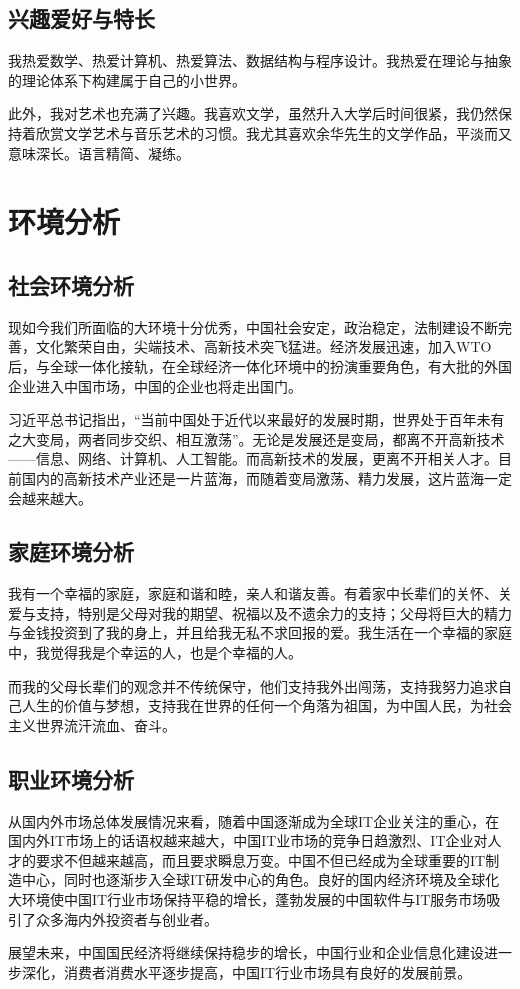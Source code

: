 \documentclass{article}
\begin{document}
\subsection{兴趣爱好与特长}
我热爱数学、热爱计算机、热爱算法、数据结构与程序设计。我热爱在理论与抽象的理论体系下构建属于自己的小世界。\par
此外，我对艺术也充满了兴趣。我喜欢文学，虽然升入大学后时间很紧，我仍然保持着欣赏文学艺术与音乐艺术的习惯。我尤其喜欢余华先生的文学作品，平淡而又意味深长。语言精简、凝练。

\section{环境分析}

\subsection{社会环境分析}
现如今我们所面临的大环境十分优秀，中国社会安定，政治稳定，法制建设不断完善，文化繁荣自由，尖端技术、高新技术突飞猛进。经济发展迅速，加入WTO后，与全球一体化接轨，在全球经济一体化环境中的扮演重要角色，有大批的外国企业进入中国市场，中国的企业也将走出国门。\par
习近平总书记指出，“当前中国处于近代以来最好的发展时期，世界处于百年未有之大变局，两者同步交织、相互激荡”。无论是发展还是变局，都离不开高新技术——信息、网络、计算机、人工智能。而高新技术的发展，更离不开相关人才。目前国内的高新技术产业还是一片蓝海，而随着变局激荡、精力发展，这片蓝海一定会越来越大。

\subsection{家庭环境分析}
我有一个幸福的家庭，家庭和谐和睦，亲人和谐友善。有着家中长辈们的关怀、关爱与支持，特别是父母对我的期望、祝福以及不遗余力的支持；父母将巨大的精力与金钱投资到了我的身上，并且给我无私不求回报的爱。我生活在一个幸福的家庭中，我觉得我是个幸运的人，也是个幸福的人。\par
而我的父母长辈们的观念并不传统保守，他们支持我外出闯荡，支持我努力追求自己人生的价值与梦想，支持我在世界的任何一个角落为祖国，为中国人民，为社会主义世界流汗流血、奋斗。

\subsection{职业环境分析}
从国内外市场总体发展情况来看，随着中国逐渐成为全球IT企业关注的重心，在国内外IT市场上的话语权越来越大，中国IT业市场的竞争日趋激烈、IT企业对人才的要求不但越来越高，而且要求瞬息万变。中国不但已经成为全球重要的IT制造中心，同时也逐渐步入全球IT研发中心的角色。良好的国内经济环境及全球化大环境使中国IT行业市场保持平稳的增长，蓬勃发展的中国软件与IT服务市场吸引了众多海内外投资者与创业者。\par
展望未来，中国国民经济将继续保持稳步的增长，中国行业和企业信息化建设进一步深化，消费者消费水平逐步提高，中国IT行业市场具有良好的发展前景。
\end{document}
